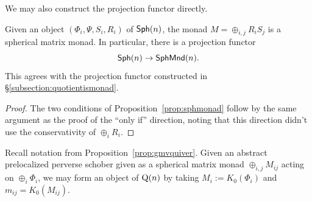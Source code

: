 We may also construct the projection functor directly.

\begin{cor}
    Given an object $(\Phi_i,\Psi,S_i,R_i)$ of $\mathsf{Sph}(n)$, the monad $M=\oplus_{i,j}R_iS_j$ is a spherical matrix monad. In particular, there is a projection functor 
    \[\mathsf{Sph}(n)\to \mathsf{SphMnd}(n).\]
    This agrees with the projection functor constructed in \S\ref{subsection:quotientismonad}.
\end{cor}

\begin{proof}
    The two conditions of Proposition~\ref{prop:sphmonad} follow by the same argument as the proof of the ``only if'' direction, noting that this direction didn't use the conservativity of $\oplus_i R_i$.
\end{proof}

\begin{cor}\label{prop:decategorification2}
    Recall notation from Proposition~\ref{prop:gmvquiver}. Given an abstract prelocalized perverse schober given as a spherical matrix monad $\oplus_{i,j} M_{ij}$ acting on $\oplus_i\Phi_i$, we may form an object of $\operatorname{Q}(n)$ by taking $M_i := K_0(\Phi_i)$ and $m_{ij} = K_0(M_{ij})$.
\end{cor}
